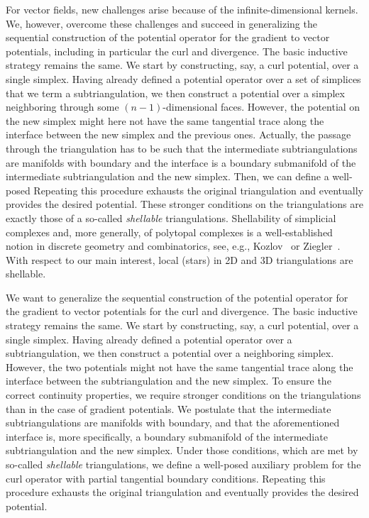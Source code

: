 For vector fields, new challenges arise because of the infinite-dimensional kernels. 
We, however, overcome these challenges and succeed in generalizing the sequential construction of the potential operator for the gradient to vector potentials, including in particular the curl and divergence. 
The basic inductive strategy remains the same. We start by constructing, say, a curl potential, over a single simplex. 
Having already defined a potential operator over a set of simplices that we term a subtriangulation, 
we then construct a potential over a simplex neighboring through some $(n-1)$-dimensional faces. 
However, the potential on the new simplex might here not have the same tangential trace along the interface between the new simplex and the previous ones. 
Actually, the passage through the triangulation has to be such that the intermediate subtriangulations are manifolds with boundary and the interface is a boundary submanifold of the intermediate subtriangulation and the new simplex. 
Then, we can define a well-posed  Repeating this procedure exhausts the original triangulation and eventually provides the desired potential.
These stronger conditions on the triangulations are exactly those of a so-called \emph{shellable} triangulations. 
Shellability of simplicial complexes and, more generally, of polytopal complexes is a well-established notion in discrete geometry and combinatorics, see, e.g., Kozlov~\cite{kozlov2008combinatorial} or Ziegler~\cite{ziegler1995lectures}.
With respect to our main interest, local  (stars) in 2D and 3D triangulations are shellable. 

We want to generalize the sequential construction of the potential operator for the gradient to vector potentials for the curl and divergence. 
The basic inductive strategy remains the same. 
We start by constructing, say, a curl potential, over a single simplex. 
Having already defined a potential operator over a subtriangulation, 
we then construct a potential over a neighboring simplex. 
However, the two potentials might not have the same tangential trace along the interface between the subtriangulation and the new simplex. 
% 
To ensure the correct continuity properties, we require stronger conditions on the triangulations than in the case of gradient potentials. 
We postulate that the intermediate subtriangulations are manifolds with boundary, and that the aforementioned interface is, more specifically, a boundary submanifold of the intermediate subtriangulation and the new simplex. 
Under those conditions, which are met by so-called \textit{shellable} triangulations, 
we define a well-posed auxiliary problem for the curl operator with partial tangential boundary conditions. 
Repeating this procedure exhausts the original triangulation and eventually provides the desired potential.

